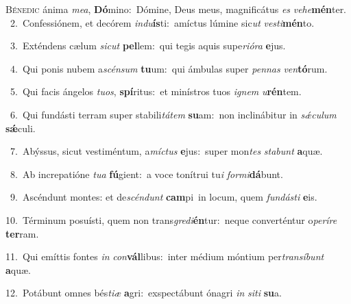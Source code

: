 \lettrine{\initial\textcolor{\initialcolor}{B}}{énedic} ánima \textit{me}\-\textit{a}, \textbf{Dó}\-mino:~\star Dómine, Deus meus, magnificátus \textit{es} \textit{ve}\-\textit{he}\textbf{mén}ter.\\
{\numbfont\textcolor{\numbcolor}{~2.}}~Confessiónem, et decórem \textit{ind}\-\textit{u}\textbf{ís}ti:~\star amíctus lúmine sic\textit{ut} \textit{ves}\-\textit{ti}\textbf{mén}to.\par
{\numbfont\textcolor{\numbcolor}{~3.}}~Exténdens cælum \textit{sic}\-\textit{ut} \textbf{pel}\-lem:~\star qui tegis aquis supe\-\textit{ri}\-\textit{ó}\textit{ra} \textbf{e}\-jus.\par
{\numbfont\textcolor{\numbcolor}{~4.}}~Qui ponis nubem a\-\textit{scén}\-\textit{sum} \textbf{tu}\-um:~\star qui ámbulas super \textit{pen}\-\textit{nas} \textit{ven}\-\textbf{tó}rum.\par
{\numbfont\textcolor{\numbcolor}{~5.}}~Qui facis ángelos \textit{tu}\-\textit{os}, \textbf{spí}\-ritus:~\star et minístros tuos \textit{i}\-\textit{gnem} \textit{u}\-\textbf{rén}tem.\par
{\numbfont\textcolor{\numbcolor}{~6.}}~Qui fundásti terram super stabili\-\textit{tá}\-\textit{tem} \textbf{su}\-am:~\star non inclinábitur in \textit{sǽ}\-\textit{cu}\textit{lum} \textbf{sǽ}\-culi.\par
{\numbfont\textcolor{\numbcolor}{~7.}}~Abýssus, sicut vestiméntum, a\-\textit{míc}\-\textit{tus} \textbf{e}\-jus:~\star super mon\textit{tes} \textit{sta}\-\textit{bunt} \textbf{a}\-quæ.\par
{\numbfont\textcolor{\numbcolor}{~8.}}~Ab increpatióne \textit{tu}\-\textit{a} \textbf{fú}\-gient:~\star a voce tonítrui tu\textit{i} \textit{for}\-\textit{mi}\textbf{dá}bunt.\par
{\numbfont\textcolor{\numbcolor}{~9.}}~Ascéndunt montes: et de\-\textit{scén}\-\textit{dunt} \textbf{cam}\-pi~\star in locum, quem \textit{fun}\-\textit{dás}\textit{ti} \textbf{e}\-is.\par
{\numbfont\textcolor{\numbcolor}{10.}}~Términum posuísti, quem non trans\-\textit{gre}\-\textit{di}\textbf{én}tur:~\star neque converténtur o\-\textit{pe}\-\textit{rí}\textit{re} \textbf{ter}\-ram.\par
{\numbfont\textcolor{\numbcolor}{11.}}~Qui emíttis fontes \textit{in} \textit{con}\-\textbf{vál}libus:~\star inter médium móntium per\-\textit{trans}\-\textit{í}\textit{bunt} \textbf{a}\-quæ.\par
{\numbfont\textcolor{\numbcolor}{12.}}~Potábunt omnes bés\-\textit{ti}\-\textit{æ} \textbf{a}\-gri:~\star exspectábunt ónagri \textit{in} \textit{si}\-\textit{ti} \textbf{su}\-a.\par
